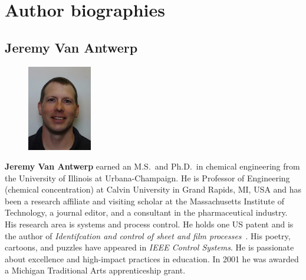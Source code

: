 

\chapter*{Author biographies}


\section*{Jeremy Van Antwerp}

\setlength{\intextsep}{-7pt}%
\setlength{\columnsep}{8pt}%
\begin{figure}
  \begin{center}
    \includegraphics[width=0.25\textwidth]{headshots/jva-headshot.jpeg}
  \end{center}
\end{figure}
\textbf{Jeremy Van Antwerp} earned an M.S.\ and Ph.D.\ in chemical engineering 
from the University of Illinois at Urbana-Champaign. 
He is Professor of Engineering (chemical concentration)
at Calvin University in Grand Rapids, MI, USA
and has been a research affiliate and visiting scholar at the Massachusetts 
Institute of Technology, a journal editor, and a consultant in the pharmaceutical 
industry.
His research area is systems and process control.
He holds one US patent and is the author of \emph{Identifcation and control of 
sheet and film processes}~\cite{FeaVB2000}.
His poetry, cartoons, and puzzles have appeared in \emph{IEEE Control Systems}.
He is passionate about excellence and high-impact practices in education.
In 2001 he was awarded a Michigan Traditional Arts apprenticeship grant.



